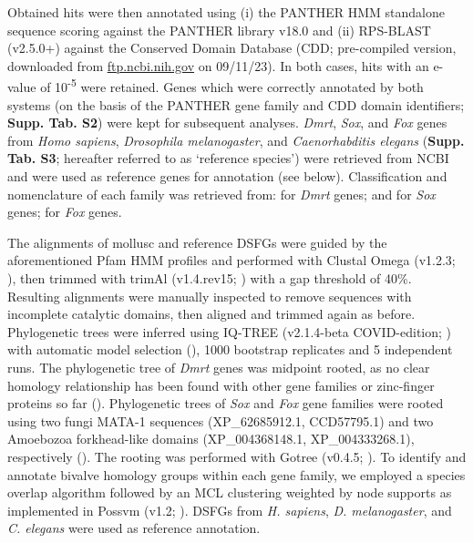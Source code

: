 \documentclass[../main.tex]{subfiles}
\begin{document}
Obtained hits were then annotated using (i) the PANTHER HMM standalone sequence scoring against the PANTHER library v18.0 and (ii) RPS-BLAST (v2.5.0+) against the Conserved Domain Database (CDD; pre-compiled version, downloaded from \href{https://ftp.ncbi.nih.gov/pub/mmdb/cdd/little\_endian/}{ftp.ncbi.nih.gov} on 09/11/23). In both cases, hits with an e-value of 10\textsuperscript{-5} were retained. Genes which were correctly annotated by both systems (on the basis of the PANTHER gene family and CDD domain identifiers; \textbf{Supp. Tab. S2}) were kept for subsequent analyses. \textit{Dmrt}, \textit{Sox}, and \textit{Fox} genes from \textit{Homo sapiens}, \textit{Drosophila melanogaster}, and \textit{Caenorhabditis elegans} (\textbf{Supp. Tab. S3}; hereafter referred to as ‘reference species’) were retrieved from NCBI and were used as reference genes for annotation (see below). Classification and nomenclature of each family was retrieved from: \textbf{\cite{mawaribuchi2019independent}} for \textit{Dmrt} genes; \textbf{\cite{phochanukul2010no}} and \textbf{\cite{sarkar2013sox}} for \textit{Sox} genes; \textbf{\cite{mazet2003phylogenetic}} for \textit{Fox} genes.

The alignments of mollusc and reference DSFGs were guided by the aforementioned Pfam HMM profiles and performed with Clustal Omega (v1.2.3; \textbf{\cite{sievers2011fast}}), then trimmed with trimAl (v1.4.rev15; \textbf{\cite{capella2009trimal}}) with a gap threshold of 40\%. Resulting alignments were manually inspected to remove sequences with incomplete catalytic domains, then aligned and trimmed again as before. Phylogenetic trees were inferred using IQ-TREE (v2.1.4-beta COVID-edition; \textbf{\cite{minh2020iq}}) with automatic model selection (\textbf{\cite{kalyaanamoorthy2017modelfinder}}), 1000 bootstrap replicates and 5 independent runs. The phylogenetic tree of \textit{Dmrt} genes was midpoint rooted, as no clear homology relationship has been found with other gene families or zinc-finger proteins so far (\textbf{\cite{wexler2014pan}}). Phylogenetic trees of \textit{Sox} and \textit{Fox} gene families were rooted using two fungi MATA-1 sequences (XP\_62685912.1, CCD57795.1) and two Amoebozoa forkhead-like domains (XP\_004368148.1, XP\_004333268.1), respectively (\textbf{\cite{heenan2016evolution,nakagawa2013dna}}). The rooting was performed with Gotree (v0.4.5; \textbf{\cite{lemoine2021gotree}}). To identify and annotate bivalve homology groups within each gene family, we employed a species overlap algorithm followed by an MCL clustering weighted by node supports as implemented in Possvm (v1.2; \textbf{\cite{grau2021orthology}}). DSFGs from \textit{H. sapiens}, \textit{D. melanogaster}, and \textit{C. elegans} were used as reference annotation.
\end{document}
